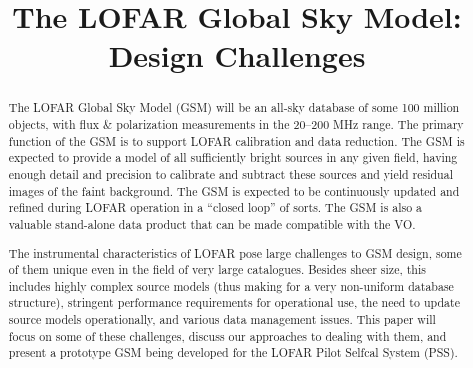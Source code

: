 \documentclass[12pt]{article}
\title{The LOFAR Global Sky Model: Design Challenges}
\begin{document}
\maketitle

\begin{abstract}

The LOFAR Global Sky Model (GSM) will be an all-sky database of some 100
million objects, with flux \& polarization measurements in the 20--200 MHz
range. The primary function of the GSM is to support LOFAR calibration and data
reduction. The GSM is expected to provide a model of all sufficiently  bright
sources in any given field, having enough detail and precision to calibrate and
subtract these sources and yield residual images of the faint background. The
GSM is expected to be continuously updated and refined during LOFAR operation
in a ``closed loop'' of sorts. The GSM is also a valuable stand-alone data
product that can be made compatible with the VO. 

The instrumental characteristics of LOFAR pose large challenges to GSM design,
some of them unique even in the field of very large catalogues. Besides sheer
size, this includes highly complex source models (thus making for a very
non-uniform database structure), stringent performance requirements for
operational use, the need to update source models operationally, and various
data management issues. This paper will focus on some of these challenges,
discuss our approaches to dealing with them, and present a prototype GSM being
developed for the LOFAR Pilot Selfcal System (PSS).

\end{abstract}
\end{document}
